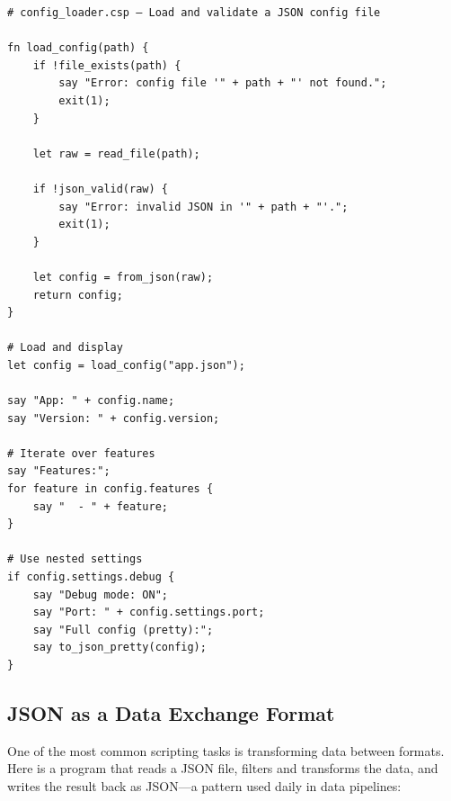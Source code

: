 \begin{tcolorbox}[colback=codebg, colframe=darkpurple, colbacktitle=darkpurple, title=\textbf{\textcolor{codegold}{JSON Configuration Loader (config\_loader.csp)}}, fonttitle=\bfseries, sharp corners]
\begin{lstlisting}
# config_loader.csp — Load and validate a JSON config file

fn load_config(path) {
    if !file_exists(path) {
        say "Error: config file '" + path + "' not found.";
        exit(1);
    }

    let raw = read_file(path);

    if !json_valid(raw) {
        say "Error: invalid JSON in '" + path + "'.";
        exit(1);
    }

    let config = from_json(raw);
    return config;
}

# Load and display
let config = load_config("app.json");

say "App: " + config.name;
say "Version: " + config.version;

# Iterate over features
say "Features:";
for feature in config.features {
    say "  - " + feature;
}

# Use nested settings
if config.settings.debug {
    say "Debug mode: ON";
    say "Port: " + config.settings.port;
    say "Full config (pretty):";
    say to_json_pretty(config);
}
\end{lstlisting}
\end{tcolorbox}

\clearpage
\subsection{JSON as a Data Exchange Format}

One of the most common scripting tasks is transforming data between formats. Here is a program that reads a JSON file, filters and transforms the data, and writes the result back as JSON—a pattern used daily in data pipelines:

